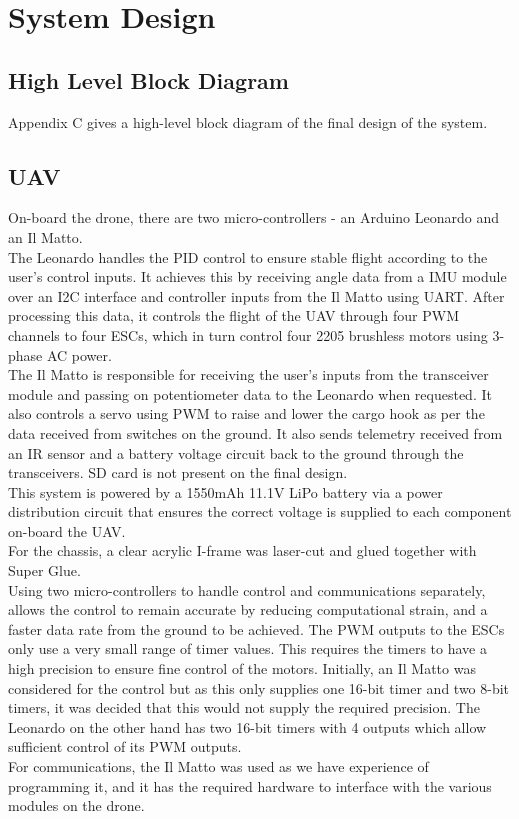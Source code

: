 \documentclass[a4paper,11pt]{article}
\begin{document}
\newpage
\section{System Design}
\subsection{High Level Block Diagram}
Appendix C gives a high-level block diagram of the final design of the system.
\subsection{UAV}
On-board the drone, there are two micro-controllers - an Arduino Leonardo and an Il Matto.\\
The Leonardo handles the PID control to ensure stable flight according to the user's control inputs. It achieves this by receiving angle data from a IMU module over an I2C interface and controller inputs from the Il Matto using UART. After processing this data, it controls the flight of the UAV through four PWM channels to four ESCs, which in turn control four 2205 brushless motors using 3-phase AC power.\\
The Il Matto is responsible for receiving the user's inputs from the transceiver module and passing on potentiometer data to the Leonardo when requested. It also controls a servo using PWM to raise and lower the cargo hook as per the data received from switches on the ground. It also sends telemetry received from an IR sensor and a battery voltage circuit back to the ground through the transceivers. SD card is not present on the final design.\\
This system is powered by a 1550mAh 11.1V LiPo battery via a power distribution circuit that ensures the correct voltage is supplied to each component on-board the UAV.\\
For the chassis, a clear acrylic I-frame was laser-cut and glued together with Super Glue.\\
Using two micro-controllers to handle control and communications separately, allows the control to remain accurate by reducing computational strain, and a faster data rate from the ground to be achieved. The PWM outputs to the ESCs only use a very small range of timer values. This requires the timers to have a high precision to ensure fine control of the motors. Initially, an Il Matto was considered for the control but as this only supplies one 16-bit timer and two 8-bit timers, it was decided that this would not supply the required precision. The Leonardo on the other hand has two 16-bit timers with 4 outputs which allow sufficient control of its PWM outputs.\\
For communications, the Il Matto was used as we have experience of programming it, and it has the required hardware to interface with the various modules on the drone.\\
\end{document}
